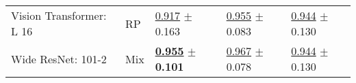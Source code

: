 \begin{tabular}{lllll}
Vision Transformer: L 16 & RP & \underline{\textcolor[rgb]{0.7518796992,0.2481203008,0}{0.917}} $\pm$ \textcolor[rgb]{0.7679332798,0.2320667202,0}{0.163} & \underline{\textcolor[rgb]{0.4000000000,0.5000000000,0}{0.955}} $\pm$ \textcolor[rgb]{0.1825904218,0.5000000000,0}{0.083} & \underline{\textcolor[rgb]{1.0000000000,0.0000000000,0}{0.944}} $\pm$ \textcolor[rgb]{1.0000000000,0.0000000000,0}{0.130} \\
Wide ResNet: 101-2 & Mix & \underline{\textbf{\textcolor[rgb]{0.0000000000,0.5000000000,0}{0.955}}} $\pm$ \textbf{\textcolor[rgb]{0.0000000000,0.5000000000,0}{0.101}} & \underline{\textcolor[rgb]{0.1142857143,0.5000000000,0}{0.967}} $\pm$ \textcolor[rgb]{0.1202863916,0.5000000000,0}{0.078} & \underline{\textcolor[rgb]{1.0000000000,0.0000000000,0}{0.944}} $\pm$ \textcolor[rgb]{1.0000000000,0.0000000000,0}{0.130} \\
\bottomrule
\end{tabular}

